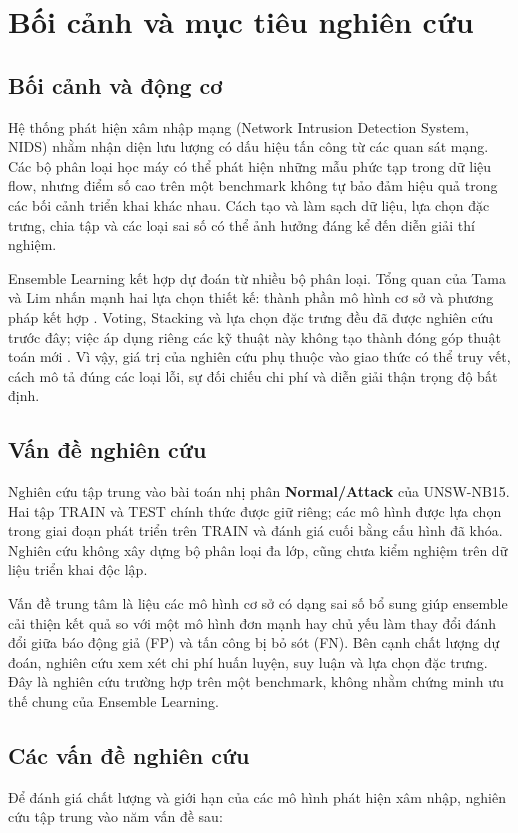 \section{Bối cảnh và mục tiêu nghiên cứu}
\label{chap:gioi-thieu}

\subsection{Bối cảnh và động cơ}
Hệ thống phát hiện xâm nhập mạng (Network Intrusion Detection System, NIDS) nhằm nhận diện lưu lượng có dấu hiệu tấn công từ các quan sát mạng. Các bộ phân loại học máy có thể phát hiện những mẫu phức tạp trong dữ liệu flow, nhưng điểm số cao trên một benchmark không tự bảo đảm hiệu quả trong các bối cảnh triển khai khác nhau. Cách tạo và làm sạch dữ liệu, lựa chọn đặc trưng, chia tập và các loại sai số có thể ảnh hưởng đáng kể đến diễn giải thí nghiệm.

Ensemble Learning kết hợp dự đoán từ nhiều bộ phân loại. Tổng quan của Tama và Lim nhấn mạnh hai lựa chọn thiết kế: thành phần mô hình cơ sở và phương pháp kết hợp \cite{legacyL01}. Voting, Stacking và lựa chọn đặc trưng đều đã được nghiên cứu trước đây; việc áp dụng riêng các kỹ thuật này không tạo thành đóng góp thuật toán mới \cite{legacyL04,legacyL05,legacyL06,legacyL12}. Vì vậy, giá trị của nghiên cứu phụ thuộc vào giao thức có thể truy vết, cách mô tả đúng các loại lỗi, sự đối chiếu chi phí và diễn giải thận trọng độ bất định.

\subsection{Vấn đề nghiên cứu}
Nghiên cứu tập trung vào bài toán nhị phân \textbf{Normal/Attack} của UNSW-NB15. Hai tập TRAIN và TEST chính thức được giữ riêng; các mô hình được lựa chọn trong giai đoạn phát triển trên TRAIN và đánh giá cuối bằng cấu hình đã khóa. Nghiên cứu không xây dựng bộ phân loại đa lớp, cũng chưa kiểm nghiệm trên dữ liệu triển khai độc lập.

Vấn đề trung tâm là liệu các mô hình cơ sở có dạng sai số bổ sung giúp ensemble cải thiện kết quả so với một mô hình đơn mạnh hay chủ yếu làm thay đổi đánh đổi giữa báo động giả (FP) và tấn công bị bỏ sót (FN). Bên cạnh chất lượng dự đoán, nghiên cứu xem xét chi phí huấn luyện, suy luận và lựa chọn đặc trưng. Đây là nghiên cứu trường hợp trên một benchmark, không nhằm chứng minh ưu thế chung của Ensemble Learning.

\subsection{Các vấn đề nghiên cứu}
Để đánh giá chất lượng và giới hạn của các mô hình phát hiện xâm nhập, nghiên cứu tập trung vào năm vấn đề sau:

